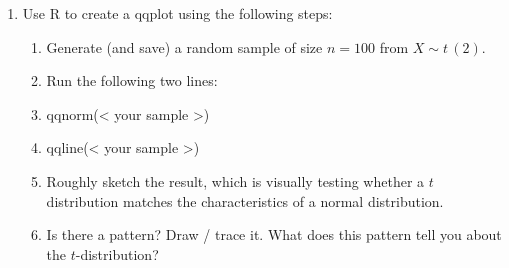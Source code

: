 \documentclass{article}
\newcommand{\follow}[1]{\sim \text{#1}\,}		%
\begin{document}
\begin{enumerate}
    \item Use R to create a qqplot using the following steps:
    \begin{enumerate}
        \item Generate (and save) a random sample of size $n = 100$ from $X \follow{$t$}(2)$.
        \item Run the following two lines:
        \item[] qqnorm(< your sample >)
        \item[] qqline(< your sample >)
        \item Roughly sketch the result, which is visually testing whether a $t$ distribution matches the characteristics of a normal distribution.
        \item[] Is there a pattern? Draw / trace it. What does this pattern tell you about the $t$-distribution? 
    \end{enumerate}
    
\end{enumerate}
\end{document}
